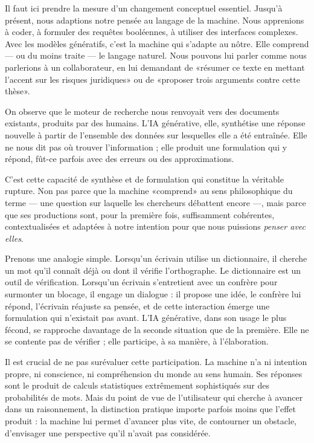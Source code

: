 Il faut ici prendre la mesure d'un changement conceptuel essentiel. Jusqu'à présent, nous adaptions notre pensée au langage de la machine. Nous apprenions à coder, à formuler des requêtes booléennes, à utiliser des interfaces complexes. Avec les modèles génératifs, c'est la machine qui s'adapte au nôtre. Elle comprend — ou du moins traite — le langage naturel. Nous pouvons lui parler comme nous parlerions à un collaborateur, en lui demandant de «résumer ce texte en mettant l'accent sur les risques juridiques» ou de «proposer trois arguments contre cette thèse».

On observe que le moteur de recherche nous renvoyait vers des documents existants, produits par des humains. L'IA générative, elle, synthétise une réponse nouvelle à partir de l'ensemble des données sur lesquelles elle a été entraînée. Elle ne nous dit pas où trouver l'information ; elle produit une formulation qui y répond, fût-ce parfois avec des erreurs ou des approximations.

C'est cette capacité de synthèse et de formulation qui constitue la véritable rupture. Non pas parce que la machine «comprend» au sens philosophique du terme — une question sur laquelle les chercheurs débattent encore —, mais parce que ses productions sont, pour la première fois, suffisamment cohérentes, contextualisées et adaptées à notre intention pour que nous puissions \emph{penser avec elles}.

Prenons une analogie simple. Lorsqu'un écrivain utilise un dictionnaire, il cherche un mot qu'il connaît déjà ou dont il vérifie l'orthographe. Le dictionnaire est un outil de vérification. Lorsqu'un écrivain s'entretient avec un confrère pour surmonter un blocage, il engage un dialogue : il propose une idée, le confrère lui répond, l'écrivain réajuste sa pensée, et de cette interaction émerge une formulation qui n'existait pas avant. L'IA générative, dans son usage le plus fécond, se rapproche davantage de la seconde situation que de la première. Elle ne se contente pas de vérifier ; elle participe, à sa manière, à l'élaboration.

Il est crucial de ne pas surévaluer cette participation. La machine n'a ni intention propre, ni conscience, ni compréhension du monde au sens humain. Ses réponses sont le produit de calculs statistiques extrêmement sophistiqués sur des probabilités de mots. Mais du point de vue de l'utilisateur qui cherche à avancer dans un raisonnement, la distinction pratique importe parfois moins que l'effet produit : la machine lui permet d'avancer plus vite, de contourner un obstacle, d'envisager une perspective qu'il n'avait pas considérée.

